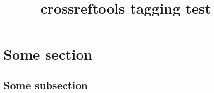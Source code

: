 \documentclass{article}
\title{crossreftools tagging test}
\begin{document}
\crtlistoflabels

\section{Some section}\label{foo}
\subsection{Some subsection}\label{baz}
\end{document}
